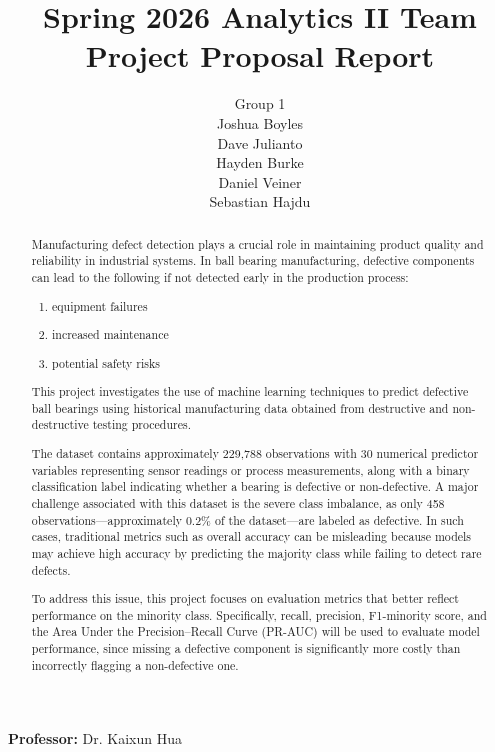 \documentclass{article}
\title{Spring 2026 Analytics II Team Project Proposal Report}
\author{
  Group 1 \\[1ex]  %
  Joshua Boyles\\
  Dave Julianto\\
  Hayden Burke\\
  Daniel Veiner\\
  Sebastian Hajdu
}
\begin{document}
\maketitle

\vspace{2em}  %
\begin{center}
  \textbf{Professor:} Dr. Kaixun Hua
\end{center}

\newpage
\begin{abstract}
Manufacturing defect detection plays a crucial role in maintaining product
quality and reliability in industrial systems. In ball bearing manufacturing,
defective components can lead to the following if not detected early in the
production process:

\begin{enumerate}
    \item equipment failures
    \item increased maintenance
    \item potential safety risks
\end{enumerate}

This project investigates the use of machine learning techniques
to predict defective ball bearings using historical manufacturing data
obtained from destructive and non-destructive testing procedures.

The dataset contains approximately 229,788 observations with 30 numerical
predictor variables representing sensor readings or process measurements,
along with a binary classification label indicating whether a bearing is
defective or non-defective. A major challenge associated with this dataset
is the severe class imbalance, as only 458 observations---approximately
0.2\% of the dataset---are labeled as defective. In such cases, traditional
metrics such as overall accuracy can be misleading because models may
achieve high accuracy by predicting the majority class while failing to
detect rare defects.

To address this issue, this project focuses on evaluation metrics that
better reflect performance on the minority class. Specifically, recall,
precision, F1-minority score, and the Area Under the Precision--Recall
Curve (PR-AUC) will be used to evaluate model performance, since missing
a defective component is significantly more costly than incorrectly
flagging a non-defective one.


\end{abstract}
\end{document}

